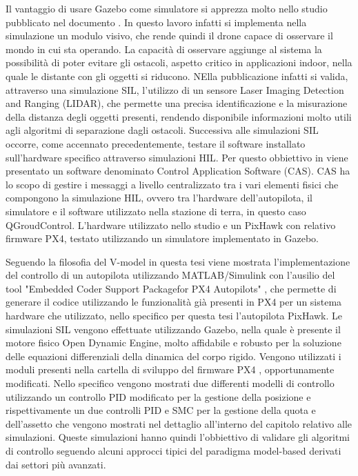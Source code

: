 Il vantaggio di usare Gazebo come simulatore si apprezza molto nello studio pubblicato nel documento \cite{Vision_base}. In questo lavoro infatti si implementa nella simulazione un modulo visivo, che rende quindi il drone capace di osservare il mondo in cui sta operando. La capacità di osservare aggiunge al sistema la possibilità di poter evitare gli ostacoli, aspetto critico in applicazioni indoor, nella quale le distante con gli oggetti si riducono. NElla pubblicazione \cite{SIL_obstacle} infatti si valida, attraverso una simulazione SIL, l'utilizzo di un sensore Laser Imaging Detection and Ranging (LIDAR), che permette una precisa identificazione e la misurazione della distanza degli oggetti presenti, rendendo disponibile informazioni molto utili agli algoritmi di separazione dagli ostacoli.
Successiva alle simulazioni SIL occorre, come accennato precedentemente, testare il software installato sull'hardware specifico attraverso simulazioni HIL. Per questo obbiettivo in \cite{HIL_Dev} viene presentato un software denominato Control Application Software (CAS). CAS ha lo scopo di gestire i messaggi a livello centralizzato tra i vari elementi fisici che compongono la simulazione HIL, ovvero tra l'hardware dell'autopilota, il simulatore e il software utilizzato nella stazione di terra, in questo caso QGroudControl. L'hardware utilizzato nello studio e un PixHawk con relativo firmware PX4, testato utilizzando un simulatore implementato in Gazebo.

Seguendo la filosofia del V-model in questa tesi viene mostrata l'implementazione del controllo di un autopilota utilizzando MATLAB/Simulink con l'ausilio del tool "Embedded Coder Support Packagefor PX4 Autopilots" \cite{toolPx4}, che permette di generare il codice utilizzando le funzionalità già presenti in PX4 per un sistema hardware che utilizzato, nello specifico per questa tesi l'autopilota PixHawk. Le simulazioni SIL vengono effettuate utilizzando Gazebo, nella quale è presente il motore fisico Open Dynamic Engine, molto affidabile e robusto per la soluzione delle equazioni differenziali della dinamica del corpo rigido. Vengono utilizzati i moduli presenti nella cartella di sviluppo del firmware PX4 \cite{px4Firmware}, opportunamente modificati. Nello specifico vengono mostrati due differenti modelli di controllo utilizzando un controllo PID modificato per la gestione della posizione e rispettivamente un due controlli PID e SMC per la gestione della quota e dell'assetto che vengono mostrati nel dettaglio all'interno del capitolo relativo alle simulazioni. Queste simulazioni hanno quindi l'obbiettivo di validare gli algoritmi di controllo seguendo alcuni approcci tipici del paradigma model-based derivati dai settori più avanzati.


